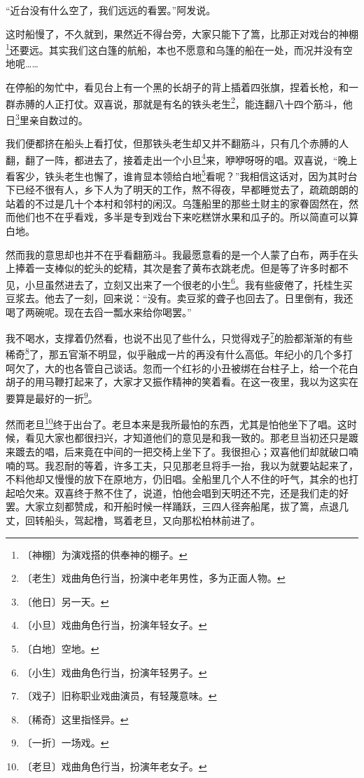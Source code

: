 \documentclass[12pt,UTF-8,openany]{ctexbook}
\begin{document}
\begin{normalsize}
    “近台没有什么空了，我们远远的看罢。”阿发说。
    
    这时船慢了，不久就到，果然近不得台旁，大家只能下了篙，比那正对戏台的神棚\footnote{〔神棚〕为演戏搭的供奉神的棚子。}还要远。其实我们这白篷的航船，本也不愿意和乌篷的船在一处，而况并没有空地呢……
    
    在停船的匆忙中，看见台上有一个黑的长胡子的背上插着四张旗，捏着长枪，和一群赤膊的人正打仗。双喜说，那就是有名的铁头老生\footnote{〔老生〕戏曲角色行当，扮演中老年男性，多为正面人物。}，能连翻八十四个筋斗，他日\footnote{〔他日〕另一天。}里亲自数过的。
    
    我们便都挤在船头上看打仗，但那铁头老生却又并不翻筋斗，只有几个赤膊的人翻，翻了一阵，都进去了，接着走出一个小旦\footnote{〔小旦〕戏曲角色行当，扮演年轻女子。}来，咿咿呀呀的唱。双喜说，“晚上看客少，铁头老生也懈了，谁肯显本领给白地\footnote{〔白地〕空地。}看呢？”我相信这话对，因为其时台下已经不很有人，乡下人为了明天的工作，熬不得夜，早都睡觉去了，疏疏朗朗的站着的不过是几十个本村和邻村的闲汉。乌篷船里的那些土财主的家眷固然在，然而他们也不在乎看戏，多半是专到戏台下来吃糕饼水果和瓜子的。所以简直可以算白地。
    
    然而我的意思却也并不在乎看翻筋斗。我最愿意看的是一个人蒙了白布，两手在头上捧着一支棒似的蛇头的蛇精，其次是套了黄布衣跳老虎。但是等了许多时都不见，小旦虽然进去了，立刻又出来了一个很老的小生\footnote{〔小生〕戏曲角色行当，扮演年轻男子。}。我有些疲倦了，托桂生买豆浆去。他去了一刻，回来说：“没有。卖豆浆的聋子也回去了。日里倒有，我还喝了两碗呢。现在去舀一瓢水来给你喝罢。”
    
    我不喝水，支撑着仍然看，也说不出见了些什么，只觉得戏子\footnote{〔戏子〕旧称职业戏曲演员，有轻蔑意味。}的脸都渐渐的有些稀奇\footnote{〔稀奇〕这里指怪异。}了，那五官渐不明显，似乎融成一片的再没有什么高低。年纪小的几个多打呵欠了，大的也各管自己谈话。忽而一个红衫的小丑被绑在台柱子上，给一个花白胡子的用马鞭打起来了，大家才又振作精神的笑着看。在这一夜里，我以为这实在要算是最好的一折\footnote{〔一折〕一场戏。}。
    
    然而老旦\footnote{〔老旦〕戏曲角色行当，扮演年老女子。}终于出台了。老旦本来是我所最怕的东西，尤其是怕他坐下了唱。这时候，看见大家也都很扫兴，才知道他们的意见是和我一致的。那老旦当初还只是踱来踱去的唱，后来竟在中间的一把交椅上坐下了。我很担心；双喜他们却就破口喃喃的骂。我忍耐的等着，许多工夫，只见那老旦将手一抬，我以为就要站起来了，不料他却又慢慢的放下在原地方，仍旧唱。全船里几个人不住的吁气，其余的也打起哈欠来。双喜终于熬不住了，说道，怕他会唱到天明还不完，还是我们走的好罢。大家立刻都赞成，和开船时候一样踊跃，三四人径奔船尾，拔了篙，点退几丈，回转船头，驾起橹，骂着老旦，又向那松柏林前进了。
    

\end{normalsize}
\end{document}
